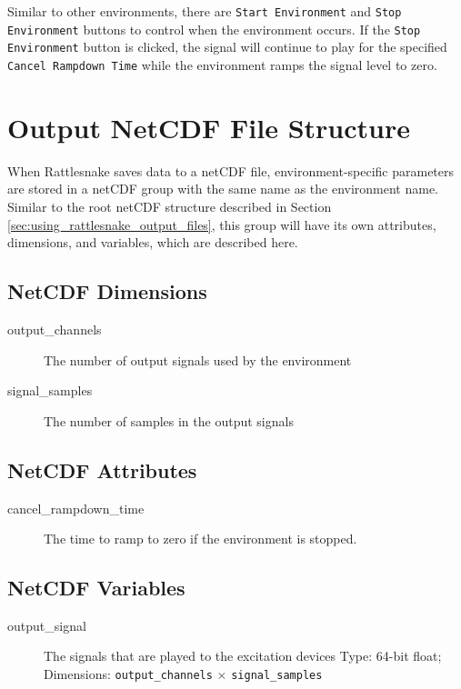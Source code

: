 \documentclass[pdf,12pt,report]{SANDreport}
\newcommand{\inlineCode}{\lstinline[basicstyle=\bfseries\ttfamily]}
\begin{document}
    Similar to other environments, there are \inlineCode{Start Environment} and \inlineCode{Stop Environment} buttons to control when the environment occurs.  If the \inlineCode{Stop Environment} button is clicked, the signal will continue to play for the specified \inlineCode{Cancel Rampdown Time} while the environment ramps the signal level to zero.
    
    \section{Output NetCDF File Structure}
    When Rattlesnake saves data to a netCDF file, environment-specific parameters are stored in a netCDF group with the same name as the environment name.  Similar to the root netCDF structure described in Section \ref{sec:using_rattlesnake_output_files}, this group will have its own attributes, dimensions, and variables, which are described here.
    
    \subsection{NetCDF Dimensions}
    \begin{description}
        \item[output\_channels] The number of output signals used by the environment
        \item[signal\_samples] The number of samples in the output signals
    \end{description}
    
    \subsection{NetCDF Attributes}
    \begin{description}
        \item[cancel\_rampdown\_time] The time to ramp to zero if the environment is stopped.
    \end{description}
    
    \subsection{NetCDF Variables}
    \begin{description}
        \item[output\_signal] The signals that are played to the excitation devices  Type: 64-bit float; Dimensions: \inlineCode{output_channels} $\times$ \inlineCode{signal_samples}
    \end{description}
    
\end{document}
